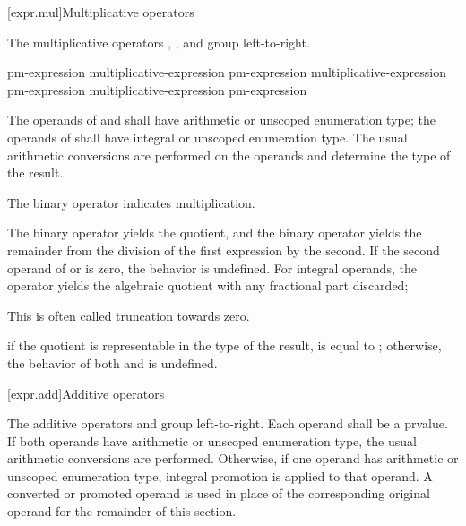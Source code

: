 [expr.mul]{Multiplicative operators}%
%

\pnum
The multiplicative operators \tcode{*}, \tcode{/}, and \tcode{\%} group
left-to-right.

%
%
%
%
%
%
%
%
\begin{bnf}
\br
    pm-expression\br
    multiplicative-expression \terminal{*} pm-expression\br
    multiplicative-expression \terminal{/} pm-expression\br
    multiplicative-expression \terminal{\%} pm-expression
\end{bnf}

\pnum
The operands of \tcode{*} and \tcode{/} shall have arithmetic or unscoped
enumeration type; the operands of \tcode{\%} shall have integral or unscoped
enumeration type. The usual arithmetic conversions are performed on the
operands and determine the type of the result.

\pnum
The binary \tcode{*} operator indicates multiplication.

\pnum
The binary \tcode{/} operator yields the quotient, and the binary
\tcode{\%} operator yields the remainder from the division of the first
expression by the second.
%
If the second operand of \tcode{/} or \tcode{\%} is zero, the behavior is
undefined.
For integral operands, the \tcode{/} operator yields the algebraic quotient with
any fractional part discarded;
\begin{footnote}
This is often called truncation towards zero.
\end{footnote}
if the quotient  is representable in the type of the result,
 is equal to ; otherwise, the behavior
of both  and  is undefined.

[expr.add]{Additive operators}%
%

\pnum
The additive operators \tcode{+} and \tcode{-} group left-to-right.
Each operand shall be a prvalue.
If both operands have arithmetic or unscoped enumeration type,
the usual arithmetic conversions are performed.
Otherwise, if one operand has arithmetic or unscoped enumeration type,
integral promotion is applied to that operand.
A converted or promoted operand is used in place of
the corresponding original operand for the remainder of this section.


